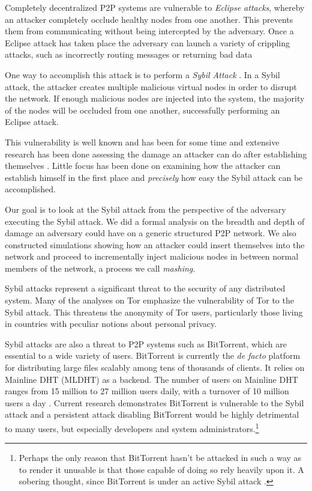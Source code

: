 \documentclass[11pt,conference]{IEEEtran}
\begin{document}
Completely decentralized P2P systems are vulnerable to \textit{Eclipse attacks}, whereby an attacker completely occlude healthy nodes from one another.
This prevents them from communicating without being intercepted by the adversary.
Once a Eclipse attack has taken place the adversary can launch a variety of crippling attacks, such as  incorrectly routing messages or returning bad data \cite{srivatsa2004vulnerabilities}

One way to accomplish this attack is to perform a \emph{Sybil Attack} \cite{sybil}.
In a Sybil attack, the attacker creates multiple malicious virtual nodes in order to disrupt the network.
If enough malicious nodes are injected into the system, the majority of the nodes will be occluded from one another, successfully performing an Eclipse attack.


This vulnerability is well known and has been for some time and extensive research has been done assessing the damage an attacker can do after  establishing themselves \cite{srivatsa2004vulnerabilities}.
Little focus has been done on examining how the attacker can establish himself in the first place and \textit{precisely} how easy the Sybil attack can be accomplished.

Our goal is to look at the Sybil attack from the perspective of the adversary executing the Sybil attack.
We did a formal analysis on the breadth and depth of damage an adversary could have on a generic structured P2P network.
We also constructed simulations showing how an attacker could insert themselves into the network and proceed to incrementally inject malicious nodes in between normal members of the network, a process we call \textit{mashing}.

Sybil attacks represent a significant threat to the security of any distributed system.
Many of the analyses \cite{bauer2007low} on Tor \cite{dingledine2004tor} emphasize the vulnerability of Tor to the Sybil attack.
This threatens the anonymity of Tor users, particularly those living in countries with peculiar notions about personal privacy.

Sybil attacks are also a threat to P2P systems such as BitTorrent, which are essential to a wide variety of users.
BitTorrent is currently the \textit{de facto} platform for distributing large files scalably among tens of thousands of clients.
It relies on Mainline DHT (MLDHT) \cite{mainline} as a backend.
The number of users on Mainline DHT ranges from 15 million to 27 million users daily, with a turnover of 10 million users a day \cite{mainlineMeasure}.
Current research demonstrates  BitTorrent is vulnerable to the Sybil attack and a persistent attack disabling BitTorrent would be highly detrimental to many users, but especially developers and system administrators.\footnote{Perhaps the only reason that BitTorrent hasn't be attacked in such a way as to render it unusable is that those capable of doing so rely heavily upon it.  A sobering thought, since BitTorrent is under an active Sybil attack \cite{sybilbit}. }
\end{document}
